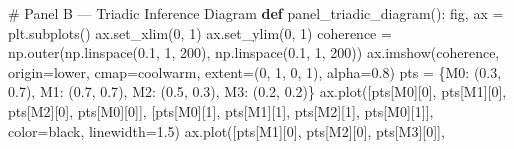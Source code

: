 \documentclass[
  11pt,
]{article}
\newenvironment{Shaded}{\begin{snugshade}}{\end{snugshade}}
\newcommand{\CommentTok}[1]{\textcolor[rgb]{0.37,0.37,0.37}{#1}}
\newcommand{\DecValTok}[1]{\textcolor[rgb]{0.68,0.00,0.00}{#1}}
\newcommand{\FloatTok}[1]{\textcolor[rgb]{0.68,0.00,0.00}{#1}}
\newcommand{\KeywordTok}[1]{\textcolor[rgb]{0.00,0.23,0.31}{\textbf{#1}}}
\newcommand{\NormalTok}[1]{\textcolor[rgb]{0.00,0.23,0.31}{#1}}
\newcommand{\OperatorTok}[1]{\textcolor[rgb]{0.37,0.37,0.37}{#1}}
\newcommand{\StringTok}[1]{\textcolor[rgb]{0.13,0.47,0.30}{#1}}
\begin{document}
\begin{Shaded}
\begin{Highlighting}[]
\CommentTok{\# Panel B — Triadic Inference Diagram}
\KeywordTok{def}\NormalTok{ panel\_triadic\_diagram():}
\NormalTok{    fig, ax }\OperatorTok{=}\NormalTok{ plt.subplots()}
\NormalTok{    ax.set\_xlim(}\DecValTok{0}\NormalTok{, }\DecValTok{1}\NormalTok{)}
\NormalTok{    ax.set\_ylim(}\DecValTok{0}\NormalTok{, }\DecValTok{1}\NormalTok{)}
\NormalTok{    coherence }\OperatorTok{=}\NormalTok{ np.outer(np.linspace(}\FloatTok{0.1}\NormalTok{, }\DecValTok{1}\NormalTok{, }\DecValTok{200}\NormalTok{), np.linspace(}\FloatTok{0.1}\NormalTok{, }\DecValTok{1}\NormalTok{, }\DecValTok{200}\NormalTok{))}
\NormalTok{    ax.imshow(coherence, origin}\OperatorTok{=}\StringTok{\textquotesingle{}lower\textquotesingle{}}\NormalTok{, cmap}\OperatorTok{=}\StringTok{\textquotesingle{}coolwarm\textquotesingle{}}\NormalTok{, extent}\OperatorTok{=}\NormalTok{(}\DecValTok{0}\NormalTok{, }\DecValTok{1}\NormalTok{, }\DecValTok{0}\NormalTok{, }\DecValTok{1}\NormalTok{), alpha}\OperatorTok{=}\FloatTok{0.8}\NormalTok{)}
\NormalTok{    pts }\OperatorTok{=}\NormalTok{ \{}\StringTok{\textquotesingle{}M0\textquotesingle{}}\NormalTok{: (}\FloatTok{0.3}\NormalTok{, }\FloatTok{0.7}\NormalTok{), }\StringTok{\textquotesingle{}M1\textquotesingle{}}\NormalTok{: (}\FloatTok{0.7}\NormalTok{, }\FloatTok{0.7}\NormalTok{), }\StringTok{\textquotesingle{}M2\textquotesingle{}}\NormalTok{: (}\FloatTok{0.5}\NormalTok{, }\FloatTok{0.3}\NormalTok{), }\StringTok{\textquotesingle{}M3\textquotesingle{}}\NormalTok{: (}\FloatTok{0.2}\NormalTok{, }\FloatTok{0.2}\NormalTok{)\}}
\NormalTok{    ax.plot([pts[}\StringTok{\textquotesingle{}M0\textquotesingle{}}\NormalTok{][}\DecValTok{0}\NormalTok{], pts[}\StringTok{\textquotesingle{}M1\textquotesingle{}}\NormalTok{][}\DecValTok{0}\NormalTok{], pts[}\StringTok{\textquotesingle{}M2\textquotesingle{}}\NormalTok{][}\DecValTok{0}\NormalTok{], pts[}\StringTok{\textquotesingle{}M0\textquotesingle{}}\NormalTok{][}\DecValTok{0}\NormalTok{]],}
\NormalTok{            [pts[}\StringTok{\textquotesingle{}M0\textquotesingle{}}\NormalTok{][}\DecValTok{1}\NormalTok{], pts[}\StringTok{\textquotesingle{}M1\textquotesingle{}}\NormalTok{][}\DecValTok{1}\NormalTok{], pts[}\StringTok{\textquotesingle{}M2\textquotesingle{}}\NormalTok{][}\DecValTok{1}\NormalTok{], pts[}\StringTok{\textquotesingle{}M0\textquotesingle{}}\NormalTok{][}\DecValTok{1}\NormalTok{]],}
\NormalTok{            color}\OperatorTok{=}\StringTok{\textquotesingle{}black\textquotesingle{}}\NormalTok{, linewidth}\OperatorTok{=}\FloatTok{1.5}\NormalTok{)}
\NormalTok{    ax.plot([pts[}\StringTok{\textquotesingle{}M1\textquotesingle{}}\NormalTok{][}\DecValTok{0}\NormalTok{], pts[}\StringTok{\textquotesingle{}M2\textquotesingle{}}\NormalTok{][}\DecValTok{0}\NormalTok{], pts[}\StringTok{\textquotesingle{}M3\textquotesingle{}}\NormalTok{][}\DecValTok{0}\NormalTok{]],}

\end{Highlighting}
\end{Shaded}
\end{document}
